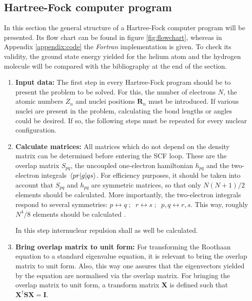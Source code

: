 \subsection{Hartree-Fock computer program}
In this section the general structure of a Hartree-Fock computer program will be presented. Its flow chart can be found in figure \ref{fig:flowchart}, whereas in Appendix \ref{appendix:code} the \emph{Fortran} implementation is given. To check its validity, the ground state energy yielded for the helium atom and the hydrogen molecule will be compared with the bibliography at the end of the section.
\begin{enumerate}
    \item \textbf{Input data:} The first step in every Hartree-Fock program should be to present the problem to be solved. For this, the number of electrons $N$, the atomic numbers $Z_n$ and nuclei positions $\mathbf{R}_n$ must be introduced. If various nuclei are present in the problem, calculating the bond lengths or angles could be desired. If so, the following steps must be repeated for every nuclear configuration.

    \item \textbf{Calculate matrices:} All matrices which do not depend on the density matrix can be determined before entering the SCF loop. These are the overlap matrix $S_{pq}$, the uncoupled one-electron hamiltonian $h_{pq}$ and the two-electron integrals $\mel{pr}{g}{qs}$. For efficiency purposes, it should be taken into account that $S_{pq}$ and $h_{pq}$ are symmetric matrices, so that only $N(N+1)/2$ elements should be calculated. More importantly, the two-electron integrals respond to several symmetries: $p\longleftrightarrow q\;; \; \; r\longleftrightarrow s\;; \; \; p,q\longleftrightarrow r,s$. This way, roughly $N^4/8$ elements should be calculated \cite{computationalphysics}.

    In this step internuclear repulsion shall as well be calculated.

    \item \textbf{Bring overlap matrix to unit form:} For transforming the Roothaan equation to a standard eigenvalue equation, it is relevant to bring the overlap matrix to unit form. Also, this way one assures that the eigenvectors yielded by the equation are normalised via the overlap matrix. For bringing the overlap matrix to unit form, a transform matrix \textbf{X} is defined such that $\mathbf{X}^\dagger \mathbf{S}\mathbf{X} = \mathbf{I}$. 
    

\end{enumerate}
